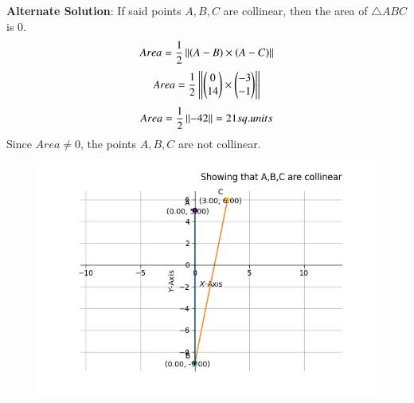 \documentclass[journal]{IEEEtran}
\begin{document}
\textbf{Alternate Solution}:
If said points $A,B,C$ are collinear, then the area of $\triangle ABC$ is 0.
    \begin{align}
        Area = \frac{1}{2}\left\vert\left\vert\left(A-B\right)\times\left(A-C\right)\right\vert\right\vert\label{eq1.1.6.22.3}
    \end{align}
    \begin{align}
        Area = \frac{1}{2}\left\vert\left\vert\begin{pmatrix}0\\14\end{pmatrix}\times\begin{pmatrix}-3\\-1\end{pmatrix}\right\vert\right\vert\label{eq1.1.6.22.3}
    \end{align}
    \begin{align}
        Area = \frac{1}{2}\left\vert\left\vert-42\right\vert\right\vert = 21 sq.units\label{eq1.1.6.22.3}
    \end{align}
Since $Area \neq 0$, the points $A,B,C$ are not collinear.
    \begin{figure}[h]
        \centering
       \includegraphics[width=0.7\linewidth]{figs/fig1.png}
       \caption{}
       \label{graph}
    \end{figure}
\end{document}
